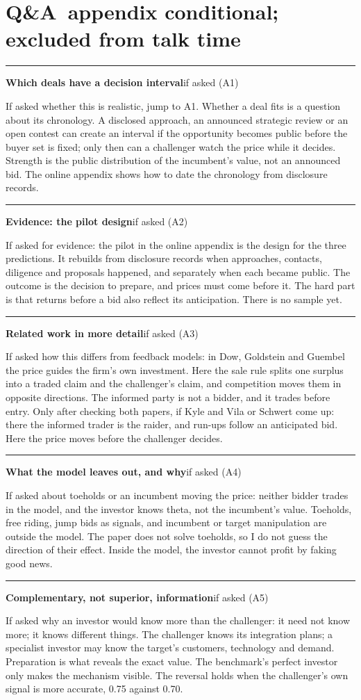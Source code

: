 \documentclass[11pt]{article}
\newcommand{\scriptframe}[3]{%
  \Needspace{9\baselineskip}%
  \par\medskip\noindent\textcolor{ScriptBlue}{\rule{\linewidth}{0.55pt}}%
  \par\smallskip\noindent
  \textbf{#1}\hfill\textcolor{ScriptGray}{\small #2}\par\smallskip
  #3\par}
\newcommand{\ScriptAppendix}{%
  \clearpage
  \section*{\mbox{Q\&A appendix} \hfill
    \normalfont\small\textcolor{ScriptGray}{conditional; excluded from talk time}}}
\begin{document}
\ScriptAppendix

\scriptframe{Which deals have a decision interval}{if asked (A1)}{%
  If asked whether this is realistic, jump to A1. Whether a deal fits is a
  question about its chronology. A disclosed approach, an announced strategic
  review or an open contest can create an interval if the opportunity becomes
  public before the buyer set is fixed; only then can a challenger watch the
  price while it decides. Strength is the public distribution of the
  incumbent's value, not an announced bid. The online appendix shows how to
  date the chronology from disclosure records.
}

\scriptframe{Evidence: the pilot design}{if asked (A2)}{%
  If asked for evidence: the pilot in the online appendix is the design for the
  three predictions. It rebuilds from disclosure records when approaches,
  contacts, diligence and proposals happened, and separately when each became
  public. The outcome is the decision to prepare, and prices must come before
  it. The hard part is that returns before a bid also reflect its anticipation.
  There is no sample yet.
}

\scriptframe{Related work in more detail}{if asked (A3)}{%
  If asked how this differs from feedback models: in Dow, Goldstein and Guembel
  the price guides the firm's own investment. Here the sale rule splits one
  surplus into a traded claim and the challenger's claim, and competition moves
  them in opposite directions. The informed party is not a bidder, and it trades
  before entry. Only after checking both papers, if Kyle and Vila or Schwert come
  up: there the informed trader is the raider, and run-ups follow an anticipated
  bid. Here the price moves before the challenger decides.
}

\scriptframe{What the model leaves out, and why}{if asked (A4)}{%
  If asked about toeholds or an incumbent moving the price: neither bidder
  trades in the model, and the investor knows theta, not the incumbent's value.
  Toeholds, free riding, jump bids as signals, and incumbent or target
  manipulation are outside the model. The paper does not solve toeholds, so I
  do not guess the direction of their effect. Inside the model, the investor
  cannot profit by faking good news.
}

\scriptframe{Complementary, not superior, information}{if asked (A5)}{%
  If asked why an investor would know more than the challenger: it need not
  know more; it knows different things. The challenger knows its integration
  plans; a specialist investor may know the target's customers, technology and
  demand. Preparation is what reveals the exact value. The benchmark's perfect
  investor only makes the mechanism visible. The reversal holds when the
  challenger's own signal is more accurate, 0.75 against 0.70.
}
\end{document}
